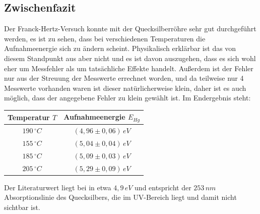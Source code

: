 \subsection{Zwischenfazit}
Der Franck-Hertz-Versuch konnte mit der Quecksilberröhre  sehr gut durchgeführt werden, es ist zu sehen, dass bei verschiedenen Temperaturen die Aufnahmeenergie sich zu ändern scheint. Physikalisch erklärbar ist das von diesem Standpunkt aus aber nicht und es ist davon auszugehen, dass es sich wohl eher um Messfehler als um tatsächliche Effekte handelt. Außerdem ist der Fehler nur aus der Streuung der Messwerte errechnet worden, und da teilweise nur 4 Messwerte vorhanden waren ist dieser natürlicherweise klein, daher ist es auch möglich, dass der angegebene Fehler zu klein gewählt ist. Im Endergebnis steht:
\begin{center}
\begin{tabular}{c|c}
Temperatur \(T\) & Aufnahmeenergie \(E_{Hg}\)\\\hline
\(190\, ^\circ C\) & \(\left( 4,96 \pm 0,06 \right) \, eV\) \\
\(155\, ^\circ C\) & \(\left( 5,04 \pm 0,04 \right) \, eV\) \\
\(185\, ^\circ C\) & \(\left( 5,09 \pm 0,03 \right) \, eV\) \\
\(205\, ^\circ C\) & \(\left( 5,29 \pm 0,09 \right) \, eV\) \\
\end{tabular}
\end{center}
Der Literaturwert liegt bei in etwa \(4,9\, eV\) und entspricht der  \(253\, nm\) Absorptionslinie des Quecksilbers, die im UV-Bereich liegt und damit nicht sichtbar ist.
